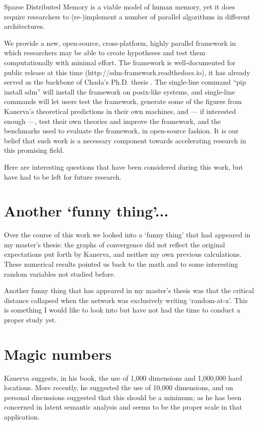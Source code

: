 Sparse Distributed Memory is a viable model of human memory, yet it does require researchers to (re-)implement a number of parallel algorithms in different architectures.

We provide a new, open-source, cross-platform, highly parallel framework in which researchers may be able to create hypotheses and test them computationally with minimal effort. The framework is well-documented for public release at this time (http://sdm-framework.readthedocs.io), it has already served as the backbone of Chada's Ph.D. thesis \citep{chada2016you}. The single-line command ``pip install sdm'' will install the framework on posix-like systems, and single-line commands will let users test the framework, generate some of the figures from Kanerva's theoretical predictions in their own machines, and --- if interested enough ---, test their own theories and improve the framework, and the benchmarks used to evaluate the framework, in open-source fashion. It is our belief that such work is a necessary component towards accelerating research in this promising field.

Here are interesting questions that have been considered during this work, but have had to be left for future research.


\section{Another `funny thing'...}

Over the course of this work we looked into a `funny thing' that had appeared in my master's thesis:  the graphs of convergence did not reflect the original expectations put forth by Kanerva, and neither my own previous calculations.  These numerical results pointed us back to the math and to some interesting random variables not studied before.

Another funny thing that has appeared in my master's thesis was that the critical distance collapsed when the network was exclusively writing `random-at-x'.  This is something I would like to look into but have not had the time to conduct a proper study yet.

\section{Magic numbers}
\label{section:Magic numbers}

Kanerva suggests, in his book, the use of 1,000 dimensions and 1,000,000 hard locations.  More recently, he suggested the use of 10,000 dimensions, and on personal discussions suggested that this should be a minimum; as he has been concerned in latent semantic analysis and seems to be the proper scale in that application.

